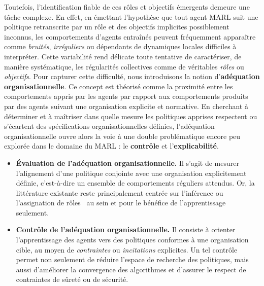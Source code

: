 \documentclass[francais,ROIA,Unicode,manuscript]{cedram}
\begin{document}
\noindent
Toutefois, l’identification fiable de ces rôles et objectifs émergents demeure une tâche complexe. En effet, en émettant l'hypothèse que tout agent MARL suit une politique retranscrite par un rôle et des objectifs implicites possiblement inconnus, les comportements d'agents entraînés peuvent fréquemment apparaître comme \emph{bruités}, \emph{irréguliers} ou dépendants de dynamiques locales difficiles à interpréter. Cette variabilité rend délicate toute tentative de caractériser, de manière systématique, les régularités collectives comme de véritables \emph{rôles} ou \emph{objectifs}.
%
Pour capturer cette difficulté, nous introduisons la notion d’\textbf{adéquation organisationnelle}. Ce concept est théorisé comme la proximité entre les comportements appris par les agents par rapport aux comportements produits par des agents suivant une organisation explicite et normative. En cherchant à déterminer et à maîtriser dans quelle mesure les politiques apprises respectent ou s’écartent des spécifications organisationnelles définies, l'adéquation organisationnelle ouvre alors la voie à une double problématique encore peu explorée dans le domaine du MARL : le \textbf{contrôle} et l’\textbf{explicabilité}.
%
\begin{itemize}
    \item \textbf{Évaluation de l’adéquation organisationnelle.}
          Il s’agit de mesurer l’alignement d’une politique conjointe avec une organisation explicitement définie, c’est-à-dire un ensemble de comportements réguliers attendus. Or, la littérature existante reste principalement centrée sur l’inférence ou l’assignation de rôles~\cite{Isakov2024, Wen2024, Xie2024} au sein et pour le bénéfice de l'apprentissage seulement.

    \item \textbf{Contrôle de l’adéquation organisationnelle.}
          Il consiste à orienter l’apprentissage des agents vers des politiques conformes à une organisation cible, au moyen de \emph{contraintes} ou \emph{incitations} explicites. Un tel contrôle permet non seulement de réduire l’espace de recherche des politiques, mais aussi d’améliorer la convergence des algorithmes et d’assurer le respect de contraintes de sûreté ou de sécurité.
\end{itemize}
\end{document}
